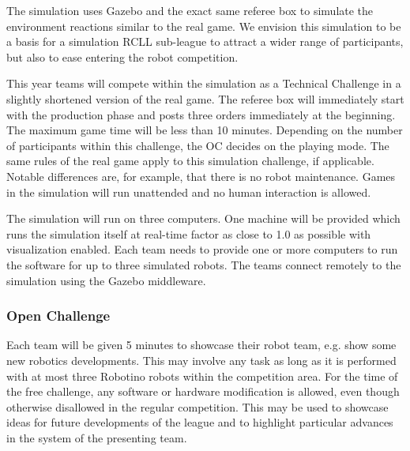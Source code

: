 \documentclass[12pt,twoside]{article}
\begin{document}
The simulation uses Gazebo and the exact same referee box to simulate
the environment reactions similar to the real game. We envision this
simulation to be a basis for a simulation RCLL sub-league to attract a
wider range of participants, but also to ease entering the robot
competition.

This year teams will compete within the simulation as a Technical
Challenge in a slightly shortened version of the real game. The
referee box will immediately start with the production phase and posts
three orders immediately at the beginning. The maximum game time will
be less than 10 minutes. Depending on the number of participants
within this challenge, the OC decides on the playing mode. The same
rules of the real game apply to this simulation challenge, if
applicable. Notable differences are, for example, that there is no
robot maintenance. Games in the simulation will run unattended and no
human interaction is allowed.

The simulation will run on three computers. One machine will be
provided which runs the simulation itself at real-time factor as close
to 1.0 as possible with visualization enabled. Each team needs to
provide one or more computers to run the software for up to three
simulated robots. The teams connect remotely to the simulation using
the Gazebo middleware.



\subsubsection{Open Challenge~}
Each team will be given 5 minutes to showcase their robot team, e.g.
show some new robotics developments. This may involve any task as long
as it is performed with at most three Robotino robots within the
competition area. For the time of the free challenge, any software or
hardware modification is allowed, even though otherwise disallowed in
the regular competition. This may be used to showcase ideas for future
developments of the league and to highlight particular advances in the
system of the presenting team.
\end{document}
